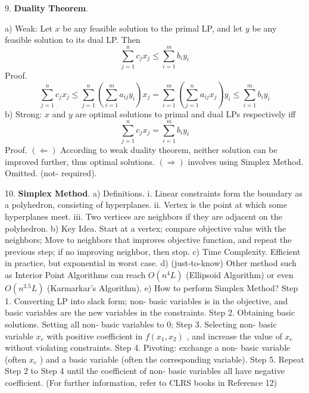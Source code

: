 \documentclass[10pt,a4paper]{article}
\begin{document}
9. \textbf{Duality Theorem}.
\begin{center}
\end{center}
a) Weak: Let \(x\) be any feasible solution to the primal LP, and let \(y\) be any feasible solution to its dual LP. Then
\[
\sum_{j = 1}^{n}c_{j}x_{j}\leq \sum_{i = 1}^{m}b_{i}y_{i}
\]
Proof.
\[
\sum_{j = 1}^{n}c_{j}x_{j}\leq \sum_{j = 1}^{n}\left(\sum_{i = 1}^{m}a_{ij}y_{i}\right)x_{j} = \sum_{i = 1}^{m}\left(\sum_{j = 1}^{n}a_{ij}x_{j}\right)y_{i}\leq \sum_{i = 1}^{m}b_{i}y_{i}
\]
b) Strong: \(x\) and \(y\) are optimal solutions to primal and dual LPs respectively iff
\[
\sum_{j = 1}^{n}c_{j}x_{j} = \sum_{i = 1}^{m}b_{i}y_{i}
\]
Proof. \((\Longleftarrow)\) According to weak duality theorem, neither solution can be improved further, thus optimal solutions. \((\Rightarrow)\) involves using Simplex Method. Omitted. (not- required).

10. \textbf{Simplex Method}.
a) Definitions.
    i. Linear constraints form the boundary as a polyhedron, consisting of hyperplanes.
    ii. Vertex is the point at which some hyperplanes meet.
    iii. Two vertices are neighbors if they are adjacent on the polyhedron.
b) Key Idea. Start at a vertex; compare objective value with the neighbors; Move to neighbors that improves objective function, and repeat the previous step; if no improving neighbor, then stop.
c) Time Complexity. Efficient in practice, but exponential in worst case.
d) (just-to-know) Other method such as Interior Point Algorithms can reach \(O(n^4 L)\) (Ellipsoid Algorithm) or even \(O(n^{3.5}L)\) (Karmarkar's Algorithm).
e) How to perform Simplex Method?
    Step 1. Converting LP into slack form; non- basic variables is in the objective, and basic variables are the new variables in the constraints.
    Step 2. Obtaining basic solutions. Setting all non- basic variables to 0;
    Step 3. Selecting non- basic variable \(x_{e}\) with positive coefficient in \(f(x_{1},x_{2})\) , and increase the value of \(x_{e}\) without violating constraints.
    Step 4. Pivoting: exchange a non- basic variable (often \(x_{e}\) ) and a basic variable (often the corresponding variable).
    Step 5. Repeat Step 2 to Step 4 until the coefficient of non- basic variables all have negative coefficient.
(For further information, refer to CLRS books in Reference 12)
\end{document}

